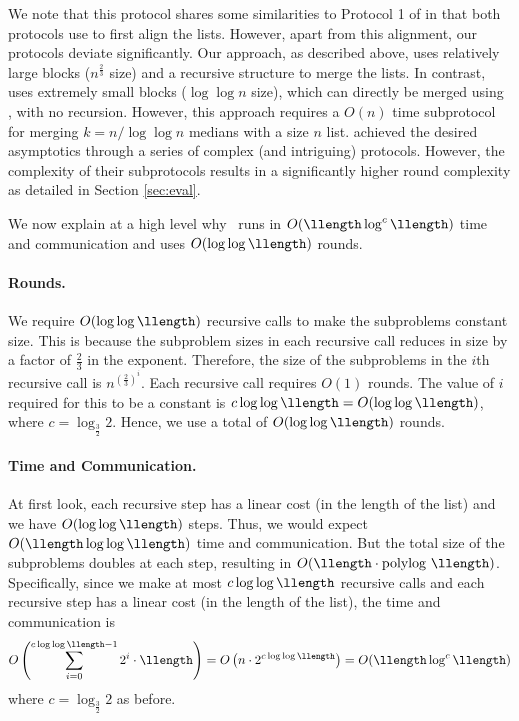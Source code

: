 \noindent
We note that this protocol shares some similarities to Protocol 1 of \cite{EPRINT:BBDLO22} in that both protocols use  to first align the lists. However, apart from this alignment, our protocols deviate significantly. Our approach, as described above, uses relatively large blocks ($n^{\frac{2}{3}}$ size) and a recursive structure to merge the lists. In contrast, \cite{EPRINT:BBDLO22} uses extremely small blocks ($\log\log n$ size), which can directly be merged using \cite{CSCML:FalNemOst22}, with no recursion. However, this approach requires a $O(n)$ time subprotocol for merging $k=n/\log\log n$ medians with a size $n$ list. \cite{CSCML:FalNemOst22} achieved the desired asymptotics through a series of complex (and intriguing) protocols. However, the complexity of their subprotocols results in a significantly higher round complexity as detailed in Section \ref{sec:eval}.

We now explain at a high level why \ourapproachtwo\ runs in $O(\llength\log^c\llength)$ time and communication and uses $O(\log\log\llength)$ rounds.

\paragraph{Rounds.} We require $O(\log\log\llength)$ recursive calls to make the subproblems constant size. This is because the subproblem sizes in each recursive call reduces in size by a factor of $\frac{2}{3}$ in the exponent. Therefore, the size of the subproblems in the $i$th recursive call is $n^{\left(\frac{2}{3}\right)^i}$. Each recursive call requires $O(1)$ rounds. The value of $i$ required for this to be a constant is $c \log \log \llength = O(\log\log\llength)$, where $c = \log_{\frac{3}{2}}2$. Hence, we use a total of $O(\log\log\llength)$ rounds.

\paragraph{Time and Communication.} At first look, each recursive step has a linear cost (in the length of the list) and we have $O(\log\log\llength)$ steps. Thus, we would expect $O(\llength\log\log\llength)$ time and communication. But the total size of the subproblems doubles at each step, resulting in $O(\llength\cdot\mathrm{polylog}\ \llength)$. Specifically, since we make at most $c\log\log\llength$ recursive calls and each recursive step has a linear cost (in the length of the list), the time and communication is$$O\left(\sum_{i = 0}^{c\log\log\llength-1}2^{i} \cdot \llength\right) = O\left(n \cdot 2^{c\log\log\llength}\right) = O(\llength\log^c\llength)$$where $c = \log_{\frac{3}{2}}2$ as before.

